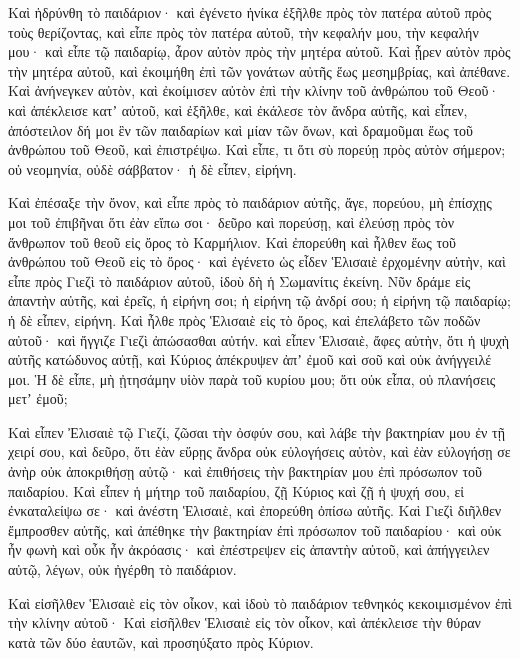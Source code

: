 {\par }{\PP {}Καὶ ἡδρύνθη τὸ παιδάριον· καὶ ἐγένετο ἡνίκα ἐξῆλθε πρὸς τὸν πατέρα αὐτοῦ πρὸς τοὺς θερίζοντας,
καὶ εἶπε πρὸς τὸν πατέρα αὐτοῦ, τὴν κεφαλήν μου, τὴν κεφαλήν μου· καὶ εἶπε τῷ παιδαρίῳ, ἆρον αὐτὸν πρὸς τὴν μητέρα αὐτοῦ.
Καὶ ᾖρεν αὐτὸν πρὸς τὴν μητέρα αὐτοῦ, καὶ ἐκοιμήθη ἐπὶ τῶν γονάτων αὐτῆς ἕως μεσημβρίας, καὶ ἀπέθανε.
Καὶ ἀνήνεγκεν αὐτὸν, καὶ ἐκοίμισεν αὐτὸν ἐπὶ τὴν κλίνην τοῦ ἀνθρώπου τοῦ Θεοῦ· καὶ ἀπέκλεισε κατʼ αὐτοῦ, καὶ ἐξῆλθε,
καὶ ἐκάλεσε τὸν ἄνδρα αὐτῆς, καὶ εἶπεν, ἀπόστειλον δή μοι ἓν τῶν παιδαρίων καὶ μίαν τῶν ὄνων, καὶ δραμοῦμαι ἕως τοῦ ἀνθρώπου τοῦ Θεοῦ, καὶ ἐπιστρέψω.
Καὶ εἶπε, τι ὅτι σὺ πορεύῃ πρὸς αὐτὸν σήμερον; οὐ νεομηνία, οὐδὲ σάββατον· ἡ δὲ εἶπεν, εἰρήνη.
\par }{\PP {}Καὶ ἐπέσαξε τὴν ὄνον, καὶ εἶπε πρὸς τὸ παιδάριον αὐτῆς, ἄγε, πορεύου, μὴ ἐπίσχῃς μοι τοῦ ἐπιβῆναι ὅτι ἐὰν εἴπω σοι· δεῦρο καὶ πορεύσῃ, καὶ ἐλεύσῃ πρὸς τὸν ἄνθρωπον τοῦ θεοῦ εἰς ὄρος τὸ Καρμήλιον.
Καὶ ἐπορεύθη καὶ ἦλθεν ἕως τοῦ ἀνθρώπου τοῦ Θεοῦ εἰς τὸ ὄρος· καὶ ἐγένετο ὡς εἶδεν Ἑλισαιὲ ἐρχομένην αὐτὴν, καὶ εἶπε πρὸς Γιεζὶ τὸ παιδάριον αὐτοῦ, ἰδοὺ δὴ ἡ Σωμανίτις ἐκείνη.
Νῦν δράμε εἰς ἀπαντὴν αὐτῆς, καὶ ἐρεῖς, ἡ εἰρήνη σοι; ἡ εἰρήνη τῷ ἀνδρί σου; ἡ εἰρήνη τῷ παιδαρίῳ; ἡ δὲ εἶπεν, εἰρήνη.
Καὶ ἦλθε πρὸς Ἑλισαιὲ εἰς τὸ ὄρος, καὶ ἐπελάβετο τῶν ποδῶν αὐτοῦ· καὶ ἤγγιζε Γιεζὶ ἀπώσασθαι αὐτήν. καὶ εἶπεν Ἑλισαιὲ, ἄφες αὐτὴν, ὅτι ἡ ψυχὴ αὐτῆς κατώδυνος αὐτῇ, καὶ Κύριος ἀπέκρυψεν ἀπʼ ἐμοῦ καὶ σοῦ καὶ οὐκ ἀνήγγειλέ μοι.
Ἡ δὲ εἶπε, μὴ ᾐτησάμην υἱὸν παρὰ τοῦ κυρίου μου; ὅτι οὐκ εἶπα, οὐ πλανήσεις μετʼ ἐμοῦ;
\par }{\PP {}Καὶ εἶπεν Ἐλισαιὲ τῷ Γιεζί, ζῶσαι τὴν ὀσφύν σου, καὶ λάβε τὴν βακτηρίαν μου ἐν τῇ χειρί σου, καὶ δεῦρο, ὅτι ἐὰν εὕρῃς ἄνδρα οὐκ εὐλογήσεις αὐτὸν, καὶ ἐὰν εὐλογήσῃ σε ἀνὴρ οὐκ ἀποκριθήσῃ αὐτῷ· καὶ ἐπιθήσεις τὴν βακτηρίαν μου ἐπὶ πρόσωπον τοῦ παιδαρίου.
Καὶ εἶπεν ἡ μήτηρ τοῦ παιδαρίου, ζῇ Κύριος καὶ ζῇ ἡ ψυχή σου, εἰ ἐνκαταλείψω σε· καὶ ἀνέστη Ἑλισαιὲ, καὶ ἐπορεύθη ὀπίσω αὐτῆς.
Καὶ Γιεζὶ διῆλθεν ἔμπροσθεν αὐτῆς, καὶ ἀπέθηκε τὴν βακτηρίαν ἐπὶ πρόσωπον τοῦ παιδαρίου· καὶ οὐκ ἦν φωνὴ καὶ οὖκ ἦν ἀκρόασις· καὶ ἐπέστρεψεν εἰς ἀπαντὴν αὐτοῦ, καὶ ἀπήγγειλεν αὐτῷ, λέγων, οὐκ ἠγέρθη τὸ παιδάριον.
\par }{\PP {}Καὶ εἰσῆλθεν Ἑλισαιὲ εἰς τὸν οἶκον, καὶ ἰδοὺ τὸ παιδάριον τεθνηκός κεκοιμισμένον ἐπὶ τὴν κλίνην αὐτοῦ·
Καὶ εἰσῆλθεν Ἑλισαιὲ εἰς τὸν οἶκον, καὶ ἀπέκλεισε τὴν θύραν κατὰ τῶν δύο ἑαυτῶν, καὶ προσηύξατο πρὸς Κύριον.
}
